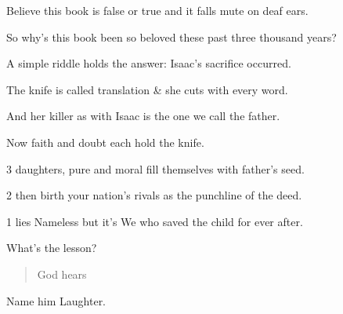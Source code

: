 {
}
{
}
{
	Believe this book is false or true and it falls mute on deaf ears.

	So why's this book been so beloved these past three thousand years?

	A simple riddle holds the answer: Isaac's sacrifice occurred.

	The knife is called translation \& she cuts with every word.

	And her killer as with Isaac is the one we call the father.

	Now faith and doubt each hold the knife.

	\begin{center}
	\end{center}


	3 daughters, pure and moral fill themselves with father's seed.

	2 then birth your nation's rivals as the punchline of the deed.

	1 lies Nameless but it's We who saved the child for ever after.


	What's the lesson?

	\begin{quote}
	 God hears   
	\end{quote}

	Name him Laughter.
}
